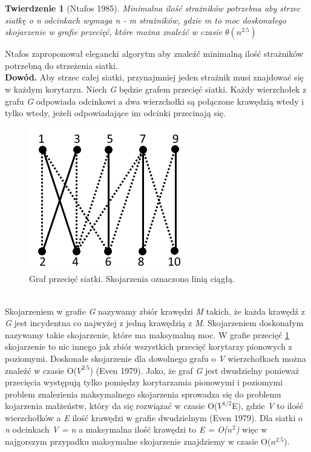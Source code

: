 \documentclass[brudnopis]{xmgr}
\newtheorem{Twierdzenie}{Twierdzenie}
\begin{document}
\begin{Twierdzenie}[Ntafos 1985]
	Minimalna ilość strażników potrzebna aby \textnormal{strzec siatkę} o \textnormal{n} odcinkach wymaga \textnormal{n - m} strażników, gdzie \textnormal{m} to moc doskonałego skojarzenie w grafie przecięć, które można znaleźć w czasie $\theta(n^{2.5})$
\end{Twierdzenie}
Ntafos zaproponował elegancki algorytm aby znaleźć minimalną ilość strażników potrzebną do strzeżenia siatki.
\\\textbf{Dowód.}
Aby strzec całej siatki, przynajmniej jeden strażnik musi znajdować się w każdym korytarzu. Niech \textit{G} będzie grafem przecięć siatki. Każdy wierzchołek z grafu \textit{G} odpowiada odcinkowi a dwa wierzchołki są połączone krawędzią wtedy i tylko wtedy, jeżeli odpowiadające im odcinki przecinają się.
 \begin{figure}[ht!]
   \centering
   \label{fig:graf przeciec}
   \includegraphics{rysunki/graf_skojarzen.png}
   \caption{Graf przecięć siatki. Skojarzenia oznaczono linią ciągłą.}
 \end{figure} 
 \\Skojarzeniem w grafie \textit{G} nazywamy zbiór krawędzi \textit{M} takich, że każda krawędź z \textit{G} jest incydentna co najwyżej z jedną krawędzią z \textit{M}. Skojarzeniem doskonałym nazywamy takie skojarzenie, które ma maksymalną moc. W grafie przecięć \ref{fig:graf przeciec} skojarzenie to nic innego jak zbiór wszystkich przecięć korytarzy pionowych z poziomymi. Doskonałe skojarzenie dla dowolnego grafu o \textit{V} wierzchołkach można znaleźć w czasie O($V^{2.5}$) (Even 1979). Jako, że graf \textit{G} jest dwudzielny ponieważ przecięcia występują tylko pomiędzy korytarzamia pionowymi i poziomymi problem znalezienia maksymalnego skojarzenia sprowadza się do problemu kojarzenia małżeństw, który da się rozwiązać w czasie O($V^{1/2}$E), gdzie \textit{V} to ilość wierzchołków a \textit{E} ilość krawędzi w grafie dwudzielnym (Even 1979). Dla siatki o \textit{n} odcinkach \textit{V = n} a maksymalna ilość krawędzi to \textit{E = O($n^2$)} więc w najgorszym przypadku maksymalne skojarzenie znajdziemy w czasie O($n^{2.5}$).
\end{document}
